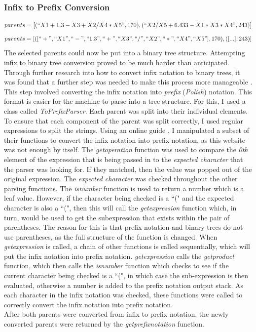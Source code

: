 \documentclass[11pt]{article}
\begin{document}
\subsubsection{Infix to Prefix Conversion}\label{subsubsec:I2P}
\begin{equation}parents = [(``X1+1.3-X3+X2/X4*X5",170),( ``X2/X5+6.433-X1*X3*X4",243)] \end{equation} \begin{equation}parents = [([``+", ``X1", ``-", ``1.3", ``+", ``X3", ``/", ``X2", ``*", ``X4", ``X5"], 170),([...],243)] \end{equation}
The selected parents could now be put into a binary tree structure. Attempting infix to binary tree conversion proved to be much harder than anticipated. Through further research into how to convert infix notation to binary trees, it was found that a further step was needed to make this process more manageable \cite{ref-pre}. This step involved converting the infix notation into \textit{prefix} (\textit{Polish}) notation. This format is easier for the machine to parse into a tree structure. For this, I used a class called \textit{ToPrefixParser}. Each parent was split into their individual elements. To ensure that each component of the parent was split correctly, I used regular expressions to split the strings.
Using an online guide \cite{ref-pre}, I manipulated a subset of their functions to convert the infix notation into prefix notation, as this website was not enough by itself. The \textit{get\textunderscore operation}  function was used to compare the \textit{0th} element of the expression that is being passed in to the \textit{expected character} that the parser was looking for. If they matched, then the value was popped out of the original expression. The \textit{expected character} was checked throughout the other parsing functions. The \textit{is\textunderscore number} function is used to return a number which is a leaf value. 
However, if the character being checked is a ``(" and the expected character is also a ``(", then this will call the \textit{get\textunderscore expression} function which, in turn, would be used to get the subexpression that exists within the pair of parentheses. The reason for this is that prefix notation and binary trees do not use parentheses, as the full structure of the function is changed. When \textit{get\textunderscore expression} is called,  a chain of other functions is called sequentially, which will put the infix notation into prefix notation.
\textit{get\textunderscore expression} calls the \textit{get\textunderscore product} function, which then calls the \textit{is\textunderscore number} function which checks to see if the current character being checked is a ``(", in which case the sub-expression is then evaluated, otherwise a number is added to the prefix notation output stack.  As each character in the infix notation was checked, these functions were called to correctly convert the infix notation into prefix notation. \\ 
After both parents were converted from infix to prefix notation, the newly converted parents were returned by the \textit{get\textunderscore prefix\textunderscore notation} function.  
\end{document}
